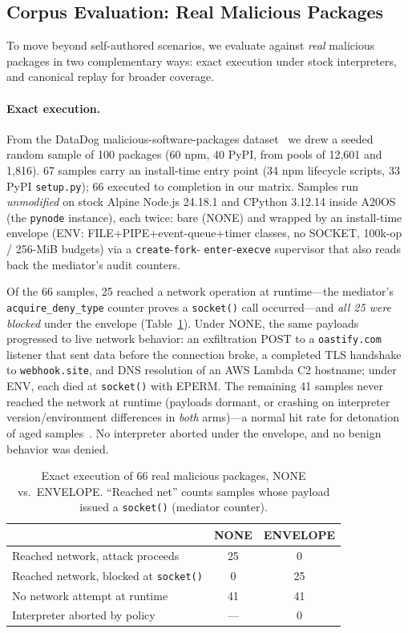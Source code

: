 \documentclass[letterpaper,twocolumn,10pt]{article}
\begin{document}
\subsection{Corpus Evaluation: Real Malicious Packages}
\label{sec:corpus}

To move beyond self-authored scenarios, we evaluate against \emph{real}
malicious packages in two complementary ways: exact execution under
stock interpreters, and canonical replay for broader coverage.

\paragraph{Exact execution.}
From the DataDog malicious-software-packages dataset~\cite{datadogdataset}
we drew a seeded random sample of 100 packages (60 npm, 40 PyPI, from
pools of 12{,}601 and 1{,}816).  67 samples carry an install-time entry
point (34 npm lifecycle scripts, 33 PyPI \texttt{setup.py}); 66 executed
to completion in our matrix.  Samples run \emph{unmodified} on stock
Alpine Node.js 24.18.1 and CPython 3.12.14 inside A20OS (the
\texttt{pynode} instance), each twice: bare (NONE) and wrapped by an
install-time envelope (ENV: FILE+PIPE+event-queue+timer classes, no
SOCKET, 100k-op / 256-MiB budgets) via a \texttt{create}-\texttt{fork}-
\texttt{enter}-\texttt{execve} supervisor that also reads back the
mediator's audit counters.

Of the 66 samples, 25 reached a network operation at runtime---the
mediator's \texttt{acquire\_deny\_type} counter proves a
\texttt{socket()} call occurred---and \emph{all 25 were blocked} under
the envelope (Table~\ref{tab:exec}).  Under NONE, the same payloads
progressed to live network behavior: an exfiltration POST to a
\texttt{oastify.com} listener that sent data before the connection
broke, a completed TLS handshake to \texttt{webhook.site}, and DNS
resolution of an AWS Lambda C2 hostname; under ENV, each died at
\texttt{socket()} with EPERM.  The remaining 41 samples never reached
the network at runtime (payloads dormant, or crashing on interpreter
version/environment differences in \emph{both} arms)---a normal hit
rate for detonation of aged samples~\cite{duan2021measuring}.  No
interpreter aborted under the envelope, and no benign behavior was
denied.

\begin{table}[t]
\centering
\caption{Exact execution of 66 real malicious packages, NONE vs.\
ENVELOPE.  ``Reached net'' counts samples whose payload issued a
\texttt{socket()} (mediator counter).}
\label{tab:exec}
\small
\begin{tabular}{lcc}
\toprule
 & \textbf{NONE} & \textbf{ENVELOPE} \\
\midrule
Reached network, attack proceeds & 25 & 0 \\
Reached network, blocked at \texttt{socket()} & 0 & 25 \\
No network attempt at runtime & 41 & 41 \\
Interpreter aborted by policy & --- & 0 \\
\bottomrule
\end{tabular}
\end{table}
\end{document}
